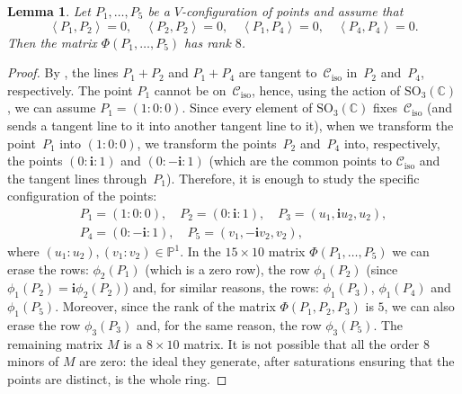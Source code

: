 \documentclass[11pt, a4paper, reqno, captions=tableheading,bibliography=totoc]{scrartcl}
\theoremstyle{plain}
\newtheorem{lemma}{Lemma}[section]
\theoremstyle{definition}
\newcommand{\p}{\mathbb{P}}
\newcommand{\iso}{\mathcal{C}_{\mathrm{iso}}}
\newcommand{\scl}[2]{\left\langle {#1}, {#2} \right\rangle}
\newcommand{\iii}{\textbf{i}}
\begin{document}
\begin{lemma}
\label{lemma:special_case_rank_8}
Let $P_1, \dots, P_5$ be a $V$-configuration of points and assume that
\[
\scl{P_1}{P_2}=0, \quad \scl{P_2}{P_2}=0, \quad \scl{P_1}{P_4}=0,
\quad \scl{P_4}{P_4}=0.
\]
Then the matrix $\Phi(P_1, \dots, P_5)$ has rank $8$.
\end{lemma}
\begin{proof}
By ,
the lines $P_1+P_2$ and $P_1+P_4$ are tangent to~$\iso$ in~$P_2$ and~$P_4$, respectively. The point $P_1$ cannot be on~$\iso$, hence, using the
action of $\mathrm{SO}_3(\mathbb{C})$, we can assume $P_1 = (1: 0: 0)$.
Since every element of $\mathrm{SO}_3(\mathbb{C})$ fixes~$\iso$ (and sends a tangent line to it into another tangent line to it), when we transform the point~$P_1$
into $(1: 0: 0)$, we transform the points~$P_2$ and~$P_4$ into, respectively,
the points $(0: \iii: 1)$ and $(0: -\iii: 1)$ (which are the common points to
$\iso$ and the tangent lines through~$P_1$).
Therefore, it is enough to study the
specific configuration of the points:
%
\begin{gather*}
P_1 = (1: 0: 0), \quad P_2=(0: \iii: 1), \quad P_3=(u_1, \iii u_2, u_2), \\
P_4 = (0: -\iii: 1), \quad P_5 = (v_1, -\iii v_2, v_2),
\end{gather*}
%
where $(u_1: u_2), (v_1: v_2) \in \p^1$.
In the $15\times 10$ matrix $\Phi(P_1, \dots, P_5)$ we can erase the
rows: $\phi_2(P_1)$ (which is a zero row), the row $\phi_1(P_2)$
(since $\phi_1(P_2)=\iii\phi_2(P_2)$) and, for similar reasons, the
rows: $\phi_1(P_3)$, $\phi_1(P_4)$ and $\phi_1(P_5)$.
Moreover, since the rank of the matrix $\Phi(P_1, P_2, P_3)$ is $5$,
we can also erase the row $\phi_3(P_3)$ and, for the same reason, the
row $\phi_3(P_5)$. The remaining matrix $M$ is a $8\times 10$ matrix.
It is not possible that all the order $8$ minors
of $M$ are zero: the ideal they generate, after saturations ensuring
that the points are distinct, is the whole ring.
\end{proof}
\end{document}
